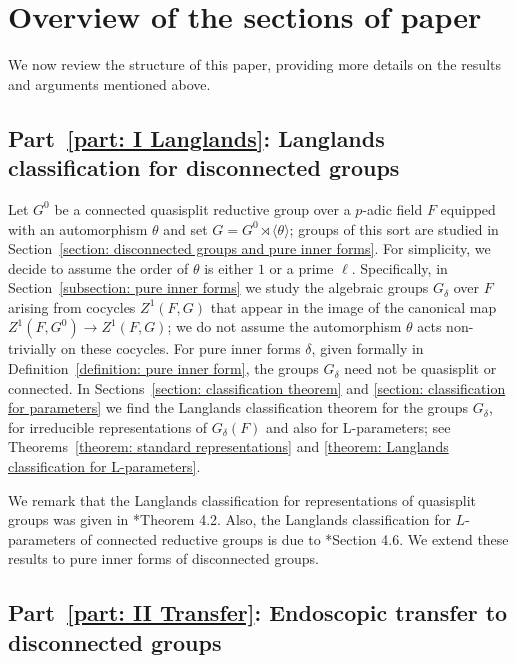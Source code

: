 \documentclass[11pt,letterpaper]{amsart}
\numberwithin{equation}{section}
\begin{document}
\tableofcontents

\section{Overview of the sections of paper}

We now review the structure of this paper,  providing more details on the results and arguments mentioned above.


\subsection{Part~\ref{part: I Langlands}: Langlands classification for disconnected groups}

Let $G^0$ be a connected quasisplit reductive group over a $p$-adic field $F$ equipped with an automorphism $\theta$ and set $G = G^0 \rtimes {\langle{\theta}\rangle}$; groups of this sort are studied in Section~\ref{section: disconnected groups and pure inner forms}. For simplicity, we decide to assume the order of $\theta$ is either $1$ or a prime $\ell$.
Specifically, in Section~\ref{subsection: pure inner forms} we study the algebraic groups $G_\delta$ over $F$ arising from cocycles $Z^1(F,G)$ that appear in the image of the canonical map $Z^1(F,G^0) \to Z^1(F,G)$; we do not assume the automorphism $\theta$ acts non-trivially on these cocycles. 
For pure inner forms $\delta$, given formally in Definition~\ref{definition: pure inner form}, the groups $G_\delta$ need not be quasisplit or connected.
In Sections~\ref{section: classification theorem} and \ref{section: classification for parameters} we find the Langlands classification theorem for the groups $G_\delta$, for  irreducible representations of $G_\delta(F)$ and also for L-parameters; see Theorems~\ref{theorem: standard representations} and \ref{theorem: Langlands classification for L-parameters}.  

We remark that the Langlands classification for representations of quasisplit groups was given in \cite{BJ01}*{Theorem 4.2}. Also, the Langlands classification for $L$-parameters of connected reductive groups is due to \cite{SZ18}*{Section 4.6}. We extend these results to pure inner forms of disconnected groups.

\subsection{Part~\ref{part: II Transfer}: Endoscopic transfer to disconnected groups}
\end{document}
